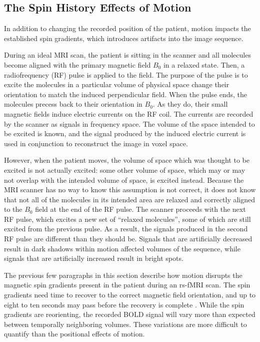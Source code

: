 \subsection{The Spin History Effects of Motion}

In addition to changing the recorded position of the patient, motion impacts the established spin gradients, which introduces artifacts into the image sequence.

During an ideal MRI scan, the patient is sitting in the scanner and all molecules become aligned with the primary magnetic field $B_0$ in a relaxed state. Then, a radiofrequency (RF) pulse is applied to the field. The purpose of the pulse is to excite the molecules in a particular volume of physical space change their orientation to match the induced perpendicular field. When the pulse ends, the molecules precess back to their orientation in $B_0$. As they do, their small magnetic fields induce electric currents on the RF coil. The currents are recorded by the scanner as signals in frequency space. The volume of the space intended to be excited is known, and the signal produced by the induced electric current is used in conjunction to reconstruct the image in voxel space.

However, when the patient moves, the volume of space which was thought to be excited is not actually excited: some other volume of space, which may or may not overlap with the intended volume of space, is excited instead. Because the MRI scanner has no way to know this assumption is not correct, it does not know that not all of the molecules in its intended area are relaxed and correctly aligned to the $B_0$ field at the end of the RF pulse. The scanner proceeds with the next RF pulse, which excites a new set of ``relaxed molecules'', some of which are still excited from the previous pulse. As a result, the signals produced in the second RF pulse are different than they should be. Signals that are artificially decreased result in dark shadows within motion affected volumes of the sequence, while signals that are artificially increased result in bright spots.

The previous few paragraphs in this section describe how motion disrupts the magnetic spin gradients present in the patient during an rs-fMRI scan. The spin gradients need time to recover to the correct magnetic field orientation, and up to eight to ten seconds may pass before the recovery is complete \cite{Power2014}. While the spin gradients are reorienting, the recorded BOLD signal will vary more than expected between temporally neighboring volumes. These variations are more difficult to quantify than the positional effects of motion.

